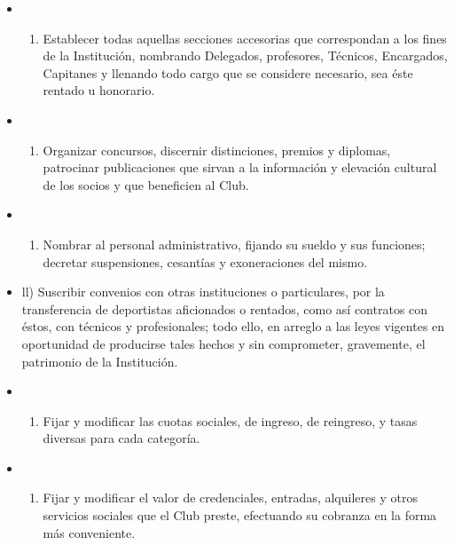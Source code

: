 \documentclass[]{book}
\providecommand{\tightlist}{%
  \setlength{\itemsep}{0pt}\setlength{\parskip}{0pt}}
\begin{document}
\begin{itemize}
\begin{itemize}
\begin{enumerate}
    \end{enumerate}
  \item
    \begin{enumerate}
    \def\labelenumi{\alph{enumi})}
    \setcounter{enumi}{9}
    \tightlist
    \item
      Establecer todas aquellas secciones accesorias que correspondan a los fines de la Institución, nombrando Delegados, profesores, Técnicos, Encargados, Capitanes y llenando todo cargo que se considere necesario, sea éste rentado u honorario.
    \end{enumerate}
  \item
    \begin{enumerate}
    \def\labelenumi{\alph{enumi})}
    \setcounter{enumi}{10}
    \tightlist
    \item
      Organizar concursos, discernir distinciones, premios y diplomas, patrocinar publicaciones que sirvan a la información y elevación cultural de los socios y que beneficien al Club.
    \end{enumerate}
  \item
    \begin{enumerate}
    \def\labelenumi{\alph{enumi})}
    \setcounter{enumi}{11}
    \tightlist
    \item
      Nombrar al personal administrativo, fijando su sueldo y sus funciones; decretar suspensiones, cesantías y exoneraciones del mismo.
    \end{enumerate}
  \item
    ll) Suscribir convenios con otras instituciones o particulares, por la transferencia de deportistas aficionados o rentados, como así contratos con éstos, con técnicos y profesionales; todo ello, en arreglo a las leyes vigentes en oportunidad de producirse tales hechos y sin comprometer, gravemente, el patrimonio de la Institución.
  \item
    \begin{enumerate}
    \def\labelenumi{\alph{enumi})}
    \setcounter{enumi}{12}
    \tightlist
    \item
      Fijar y modificar las cuotas sociales, de ingreso, de reingreso, y tasas diversas para cada categoría.
    \end{enumerate}
  \item
    \begin{enumerate}
    \def\labelenumi{\alph{enumi})}
    \setcounter{enumi}{13}
    \tightlist
    \item
      Fijar y modificar el valor de credenciales, entradas, alquileres y otros servicios sociales que el Club preste, efectuando su cobranza en la forma más conveniente.

\end{enumerate}
\end{itemize}
\end{itemize}
\end{document}

